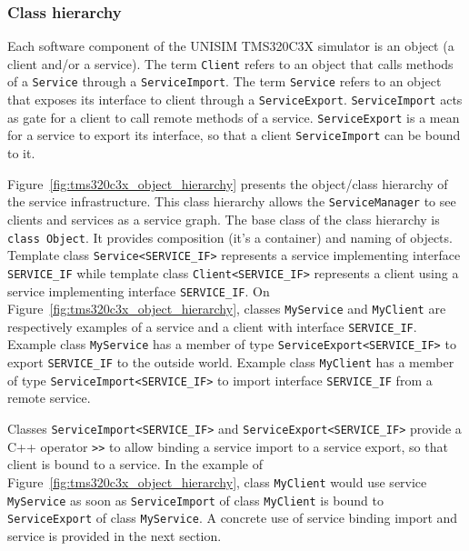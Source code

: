 \subsubsection{Class hierarchy}

Each software component of the UNISIM TMS320C3X simulator is an object (a client and/or a service). 
The term \texttt{Client} refers to an object that calls methods of a \texttt{Service} through a \texttt{ServiceImport}. 
The term \texttt{Service} refers to an object that exposes its interface to client through a \texttt{ServiceExport}. 
\texttt{ServiceImport} acts as gate for a client to call remote methods of a service. \texttt{ServiceExport} is a mean for a service to export its interface, so that a client \texttt{ServiceImport} can be bound to it.

Figure~\ref{fig:tms320c3x_object_hierarchy} presents the object/class hierarchy of the service infrastructure.
This class hierarchy allows the \texttt{ServiceManager} to see clients and services as a service graph. 
The base class of the class hierarchy is \texttt{class Object}. 
It provides composition (it's a container) and naming of objects.
Template class \texttt{Service<SERVICE\_IF>} represents a service implementing interface \texttt{SERVICE\_IF} while template class \texttt{Client<SERVICE\_IF>} represents a client using a service implementing interface \texttt{SERVICE\_IF}.
On Figure~\ref{fig:tms320c3x_object_hierarchy}, classes \texttt{MyService} and \texttt{MyClient} are respectively examples of a service and a client with interface \texttt{SERVICE\_IF}.
Example class \texttt{MyService} has a member of type \texttt{ServiceExport<SERVICE\_IF>} to export \texttt{SERVICE\_IF} to the outside world.
Example class \texttt{MyClient} has a member of type \texttt{ServiceImport<SERVICE\_IF>} to import interface \texttt{SERVICE\_IF} from a remote service.

Classes \texttt{ServiceImport<SERVICE\_IF>} and \texttt{ServiceExport<SERVICE\_IF>} provide a C++ operator \texttt{>>} to allow binding a service import to a service export, so that client is bound to a service.
In the example of Figure~\ref{fig:tms320c3x_object_hierarchy}, class \texttt{MyClient} would use service \texttt{MyService} as soon as \texttt{ServiceImport} of class \texttt{MyClient} is bound to \texttt{ServiceExport} of class \texttt{MyService}.
A concrete use of service binding import and service is provided in the next section.

